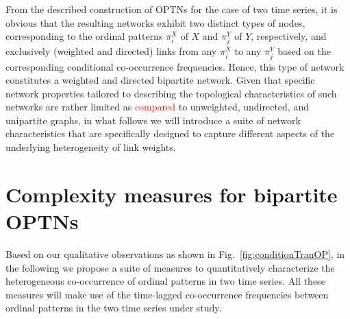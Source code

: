 \documentclass[12pt,aip,cha,reprint,nofootinbib]{revtex4-1}
\begin{document}
From the described construction of OPTNs for the case of two time series, it is obvious that the resulting networks exhibit two distinct types of nodes, corresponding to the ordinal patterns $\pi_i^X$ of $X$ and $\pi_j^Y$ of $Y$, respectively, and exclusively (weighted and directed) links from any $\pi_i^X$ to any $\pi_j^Y$ based on the corresponding conditional co-occurrence frequencies. Hence, this type of network constitutes a weighted and directed bipartite network. Given that specific network properties tailored to describing the topological characteristics of such networks are rather limited as \textcolor{red}{compared} to unweighted, undirected, and unipartite graphs, in what follows we will introduce a suite of network characteristics that are specifically designed to capture different aspects of the underlying heterogeneity of link weights.

\section{Complexity measures for bipartite OPTNs} \label{sec:measures}

Based on our qualitative observations as shown in Fig.~\ref{fig:conditionTranOP}, in the following we propose a suite of measures to quantitatively characterize the heterogeneous co-occurrence of ordinal patterns in two time series. All these measures will make use of the time-lagged co-occurrence frequencies between ordinal patterns in the two time series under study.
\end{document}
